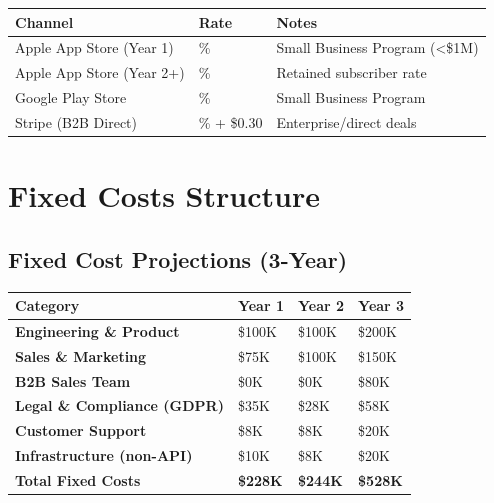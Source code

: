 \documentclass[11pt,a4paper]{article}
\begin{document}
\begin{center}
\renewcommand{\arraystretch}{1.4}
\begin{tabular}{>{\raggedright\arraybackslash}p{5cm} >{\centering\arraybackslash}p{3cm} >{\centering\arraybackslash}p{5cm}}
\toprule
\rowcolor{miloprimary!15}
\textbf{Channel} & \textbf{Rate} & \textbf{Notes} \\
\midrule
Apple App Store (Year 1) & 15\% & Small Business Program (<\$1M) \\
\rowcolor{lightbg}
Apple App Store (Year 2+) & 15\% & Retained subscriber rate \\
Google Play Store & 15\% & Small Business Program \\
\rowcolor{lightbg}
Stripe (B2B Direct) & 2.9\% + \$0.30 & Enterprise/direct deals \\
\bottomrule
\end{tabular}
\end{center}

\newpage

\section*{\textcolor{miloprimary}{Fixed Costs Structure}}

\subsection*{\textcolor{milosecondary}{Fixed Cost Projections (3-Year)}}

\begin{center}
\renewcommand{\arraystretch}{1.5}
\begin{tabular}{>{\raggedright\arraybackslash}p{4.5cm} >{\centering\arraybackslash}p{2.8cm} >{\centering\arraybackslash}p{2.8cm} >{\centering\arraybackslash}p{2.8cm}}
\toprule
\rowcolor{miloprimary!15}
\textbf{Category} & \textbf{Year 1} & \textbf{Year 2} & \textbf{Year 3} \\
\midrule
\textbf{Engineering \& Product} & \$100K & \$100K & \$200K \\
\rowcolor{lightbg}
\textbf{Sales \& Marketing} & \$75K & \$100K & \$150K \\
\textbf{B2B Sales Team} & \$0K & \$0K & \$80K \\
\rowcolor{lightbg}
\textbf{Legal \& Compliance (GDPR)} & \$35K & \$28K & \$58K \\
\textbf{Customer Support} & \$8K & \$8K & \$20K \\
\rowcolor{lightbg}
\textbf{Infrastructure (non-API)} & \$10K & \$8K & \$20K \\
\midrule
\rowcolor{miloprimary!15}
\textbf{Total Fixed Costs} & \textbf{\$228K} & \textbf{\$244K} & \textbf{\$528K} \\
\bottomrule
\end{tabular}
\end{center}
\end{document}
